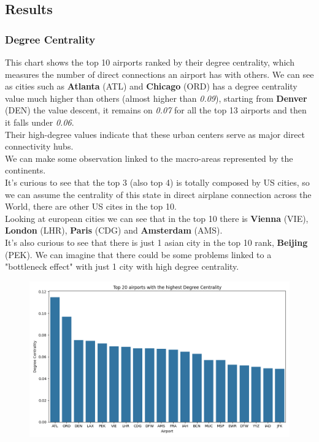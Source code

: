 \documentclass[12pt]{article}
\begin{document}
    \subsection{Results}\label{subsec:results}

    \subsubsection{Degree Centrality}
    This chart shows the top 10 airports ranked by their degree centrality, which measures the number of direct connections an airport has with others. We can see as cities such as \textbf{Atlanta} (ATL) and \textbf{Chicago} (ORD) has a degree centrality value much higher than others (almost higher than \textit{0.09}), starting from \textbf{Denver} (DEN) the value descent, it remains on \textit{0.07} for all the top 13 airports and then it falls under \textit{0.06}.\\
    Their high-degree values indicate that these urban centers serve as major direct connectivity hubs.\\
    We can make some observation linked to the macro-areas represented by the continents.\\
    It's curious to see that the top 3 (also top 4) is totally composed by US cities, so we can assume the centrality of this state in direct airplane connection across the World, there are other US cites in the top 10.\\
    Looking at european cities we can see that in the top 10 there is \textbf{Vienna} (VIE), \textbf{London} (LHR), \textbf{Paris} (CDG) and \textbf{Amsterdam} (AMS).\\
    It's also curious to see that there is just 1 asian city in the top 10 rank, \textbf{Beijing} (PEK). We can imagine that there could be some problems linked to a "bottleneck effect" with just 1 city with high degree centrality.

    \begin{figure}[H]
        \centering
        \includegraphics[width=0.8\linewidth]{img/degree_centrality.png}
    \end{figure}
\end{document}
